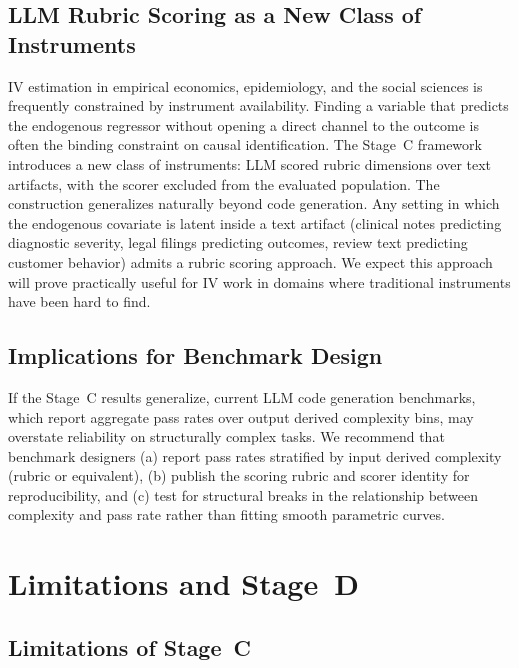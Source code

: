 \documentclass[conference]{IEEEtran}
\begin{document}
\subsection{LLM Rubric Scoring as a New Class of Instruments}

IV estimation in empirical economics, epidemiology, and the social sciences is frequently constrained by instrument availability. Finding a variable that predicts the endogenous regressor without opening a direct channel to the outcome is often the binding constraint on causal identification. The Stage~C framework introduces a new class of instruments: LLM scored rubric dimensions over text artifacts, with the scorer excluded from the evaluated population. The construction generalizes naturally beyond code generation. Any setting in which the endogenous covariate is latent inside a text artifact (clinical notes predicting diagnostic severity, legal filings predicting outcomes, review text predicting customer behavior) admits a rubric scoring approach. We expect this approach will prove practically useful for IV work in domains where traditional instruments have been hard to find.

\subsection{Implications for Benchmark Design}
If the Stage~C results generalize, current LLM code generation benchmarks, which report aggregate pass rates over output derived complexity bins, may overstate reliability on structurally complex tasks. We recommend that benchmark designers (a) report pass rates stratified by input derived complexity (rubric or equivalent), (b) publish the scoring rubric and scorer identity for reproducibility, and (c) test for structural breaks in the relationship between complexity and pass rate rather than fitting smooth parametric curves.

\section{Limitations and Stage~D}
\label{sec:stage-d}

\subsection{Limitations of Stage~C}
\end{document}
